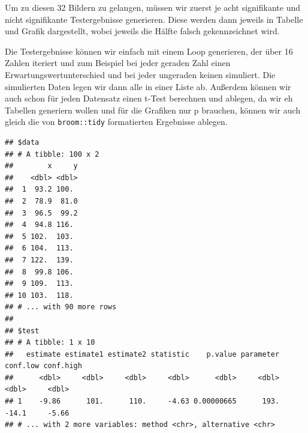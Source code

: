 \documentclass[
]{book}
\newenvironment{Shaded}{\begin{snugshade}}{\end{snugshade}}
\newcommand{\AttributeTok}[1]{\textcolor[rgb]{0.77,0.63,0.00}{#1}}
\newcommand{\ControlFlowTok}[1]{\textcolor[rgb]{0.13,0.29,0.53}{\textbf{#1}}}
\newcommand{\DecValTok}[1]{\textcolor[rgb]{0.00,0.00,0.81}{#1}}
\newcommand{\FunctionTok}[1]{\textcolor[rgb]{0.00,0.00,0.00}{#1}}
\newcommand{\NormalTok}[1]{#1}
\newcommand{\OtherTok}[1]{\textcolor[rgb]{0.56,0.35,0.01}{#1}}
\newcommand{\SpecialCharTok}[1]{\textcolor[rgb]{0.00,0.00,0.00}{#1}}
\begin{document}
Um zu diesen 32 Bildern zu gelangen, müssen wir zuerst je acht signifikante und nicht signifikante Testergebnisse generieren. Diese werden dann jeweils in Tabelle und Grafik dargestellt, wobei jeweils die Hälfte falsch gekennzeichnet wird.

Die Testergebnisse können wir einfach mit einem Loop generieren, der über 16 Zahlen iteriert und zum Beispiel bei jeder geraden Zahl einen Erwartungswertunterschied und bei jeder ungeraden keinen simuliert. Die simulierten Daten legen wir dann alle in einer Liste ab.
Außerdem können wir auch schon für jeden Datensatz einen t-Test berechnen und ablegen, da wir eh Tabellen generiern wollen und für die Grafiken nur p brauchen, können wir auch gleich die von \texttt{broom::tidy} formatierten Ergebnisse ablegen.

\begin{Shaded}
\end{Shaded}

\begin{verbatim}
## $data
## # A tibble: 100 x 2
##        x     y
##    <dbl> <dbl>
##  1  93.2 100. 
##  2  78.9  81.0
##  3  96.5  99.2
##  4  94.8 116. 
##  5 102.  103. 
##  6 104.  113. 
##  7 122.  139. 
##  8  99.8 106. 
##  9 109.  113. 
## 10 103.  118. 
## # ... with 90 more rows
## 
## $test
## # A tibble: 1 x 10
##   estimate estimate1 estimate2 statistic    p.value parameter conf.low conf.high
##      <dbl>     <dbl>     <dbl>     <dbl>      <dbl>     <dbl>    <dbl>     <dbl>
## 1    -9.86      101.      110.     -4.63 0.00000665      193.    -14.1     -5.66
## # ... with 2 more variables: method <chr>, alternative <chr>
\end{verbatim}
\end{document}
